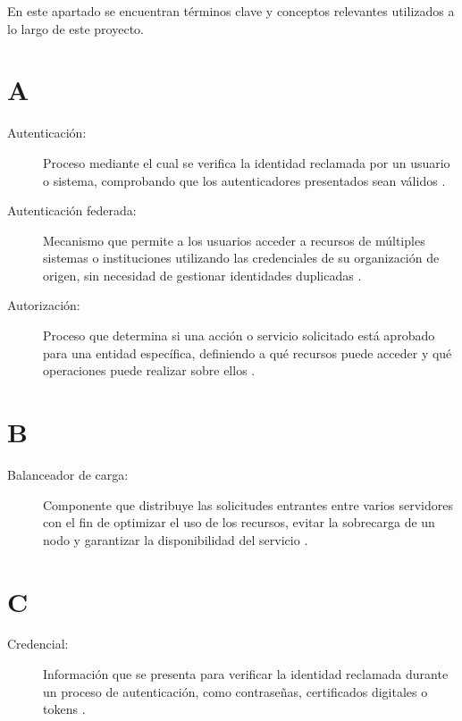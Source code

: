 \label{cap:glosario}
\vspace*{0.7cm}

En este apartado se encuentran términos clave y conceptos relevantes utilizados a lo largo de este proyecto.

\section*{A}
\begin{description}
	\item[Autenticación:] Proceso mediante el cual se verifica la identidad reclamada por un usuario o sistema, comprobando que los autenticadores presentados sean válidos \citep{NIST80063v4}.
	\item[Autenticación federada:] Mecanismo que permite a los usuarios acceder a recursos de múltiples sistemas o instituciones utilizando las credenciales de su organización de origen, sin necesidad de gestionar identidades duplicadas \citep{Prout2019}.
	\item[Autorización:] Proceso que determina si una acción o servicio solicitado está aprobado para una entidad específica, definiendo a qué recursos puede acceder y qué operaciones puede realizar sobre ellos \citep{OWASP2026}.
\end{description}

\section*{B}
\begin{description}
	\item[Balanceador de carga:] Componente que distribuye las solicitudes entrantes entre varios servidores con el fin de optimizar el uso de los recursos, evitar la sobrecarga de un nodo y garantizar la disponibilidad del servicio \citep{Cloudflare2026}.
\end{description}

\section*{C}
\begin{description}
	\item[Credencial:] Información que se presenta para verificar la identidad reclamada durante un proceso de autenticación, como contraseñas, certificados digitales o tokens \citep{NIST80063v4}.
\end{description}

